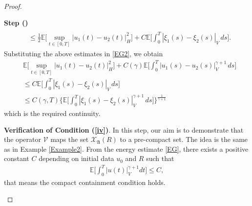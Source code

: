 \documentclass[english,a4paper,11pt]{amsart}
\theoremstyle{plain}
\theoremstyle{definition}
\theoremstyle{remark}
\numberwithin{equation}{section}
\newcounter{lil1}
\newenvironment{step}
{\begin{list} { \bf Step (\Roman{lil1})}
		{ \usecounter{lil1}
			\setlength{\leftmargin}{0.0cm}
			\setlength{\topsep}{0.2cm}
			\setlength{\itemsep}{0.0cm}
			\setlength{\parsep}{0.1cm}
			\setlength{\itemindent}{0.8cm}
			\setlength{\parskip}{0.0cm}}}
	{\end{list}}
\newcounter{lil33}
\newcounter{lil1q}
\newcommand{\MA}{\mathfrak{A}}
\newcommand{\EE}{ \mathbb{E} }
\newcommand{\Vcal} {{\mathcal V}}
\newcommand{\Xcal} {{\mathcal X}}
\begin{document}
\begin{proof}
\begin{step}
\begin{align*}
	\\&\leq 
		\frac{1}{2}\EE\bigg[\sup_{t\in[0,T]} | u_1(t)-u_2(t) | _H^2\bigg]+C \EE\bigg[\int_0^T  | \xi_1(s)-\xi_2(s) | _V\,ds \bigg].
\end{align*}Substituting the above estimates in \eqref{EG2}, we obtain 
\begin{align*}
	&\EE\bigg[\sup_{t\in[0,T]} | u_1(t)-u_2(t) | _H^2\bigg]+C(\gamma)\EE\bigg[ \int_0^T | u_1(s)-u_2(s) | _V^{\gamma+1}\,ds \bigg]
	\\&
	\leq  C \EE\bigg[\int_0^T  | \xi_1(s)-\xi_2(s) | _V\,ds \bigg]
	\\&
	\leq C (\gamma,T)\bigg\{\EE\bigg[\int_0^T  | \xi_1(s)-\xi_2(s) | _V^{\gamma+1}\,ds \bigg]\bigg\}^\frac{1}{\gamma+1}
\end{align*} which is the required continuity. 



\item \textbf{Verification of Condition (\ref{iv})}. In this step, our aim is to demonstrate that the operator $\Vcal$ maps the set $\Xcal_\MA(R)$ to a pre-compact set. The idea is the same as in Example \ref{Example2}. 
From the energy estimate \eqref{EG}, there exists a positive constant $C$ depending on initial data $u_0$ and $R$ such that 
\begin{align*}
	\EE\bigg[\int_0^T|u(t)|_V^{\gamma+1}dt\bigg]\leq C, 
\end{align*}that means the compact containment condition holds.


\end{step}
\end{proof}
\end{document}
